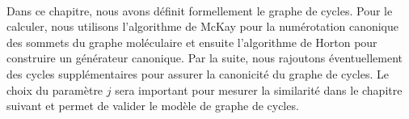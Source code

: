 \paragraph{} Dans ce chapitre, nous avons définit formellement le graphe de cycles. Pour le calculer, nous utilisons l'algorithme de McKay pour la numérotation canonique des sommets du graphe moléculaire et ensuite l'algorithme de Horton pour construire un générateur canonique. Par la suite, nous rajoutons éventuellement des cycles supplémentaires pour assurer la canonicité du graphe de cycles. Le choix du paramètre $j$ sera important pour mesurer la similarité dans le chapitre suivant et permet de valider le modèle de graphe de cycles.